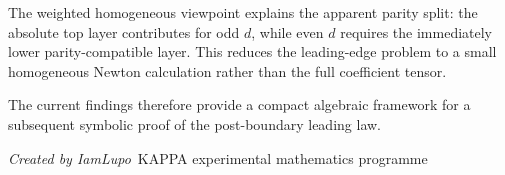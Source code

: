 \documentclass[11pt,a4paper]{article}
\begin{document}
The weighted homogeneous viewpoint explains the apparent parity split: the absolute top layer contributes for odd $d$, while even $d$ requires the immediately lower parity-compatible layer. This reduces the leading-edge problem to a small homogeneous Newton calculation rather than the full coefficient tensor.

The current findings therefore provide a compact algebraic framework for a subsequent symbolic proof of the post-boundary leading law.

\vfill
\begin{center}
\textit{Created by IamLupo}\
KAPPA experimental mathematics programme
\end{center}
\end{document}
